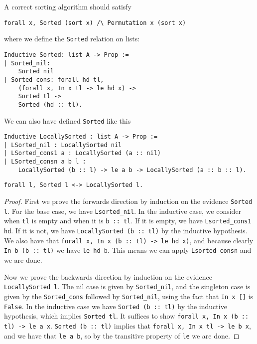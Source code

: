 \documentclass[11pt]{article}
\begin{document}
A correct sorting algorithm should satisfy
\begin{verbatim}
forall x, Sorted (sort x) /\ Permutation x (sort x)
\end{verbatim}
where we define the \verb|Sorted| relation on lists:
\begin{verbatim}
Inductive Sorted: list A -> Prop :=
| Sorted_nil:
    Sorted nil
| Sorted_cons: forall hd tl,
    (forall x, In x tl -> le hd x) ->
    Sorted tl ->
    Sorted (hd :: tl).
\end{verbatim}

We can also have defined \verb|Sorted| like this
\begin{verbatim}
Inductive LocallySorted : list A -> Prop :=
| LSorted_nil : LocallySorted nil
| LSorted_cons1 a : LocallySorted (a :: nil)
| LSorted_consn a b l :
    LocallySorted (b :: l) -> le a b -> LocallySorted (a :: b :: l).
\end{verbatim}

\begin{theorem}
\begin{verbatim}
forall l, Sorted l <-> LocallySorted l.
\end{verbatim}
\end{theorem}

\begin{proof}
  First we prove the forwards direction by induction on the evidence
  \verb|Sorted l|. For the base case, we have \verb|Lsorted_nil|. In
  the inductive case, we consider when \verb|tl| is empty and when it
  is \verb|b :: tl|. If it is empty, we have \verb|Lsorted_cons1 hd|.
  If it is not, we have \verb|LocallySorted (b :: tl)| by the
  inductive hypothesis. We also have that
  \verb|forall x, In x (b :: tl) -> le hd x)|, and because clearly
  \verb|In b (b :: tl)| we have \verb|le hd b|. This means we can
  apply \verb|Lsorted_consn| and we are done.

  Now we prove the backwards direction by induction on the evidence
  \verb|LocallySorted l|. The nil case is given by \verb|Sorted_nil|,
  and the singleton case is given by the \verb|Sorted_cons| followed
  by \verb|Sorted_nil|, using the fact that \verb|In x []| is
  \verb|False|. In the inductive case we have \verb|Sorted (b :: tl)|
  by the inductive hypothesis, which implies \verb|Sorted tl|. It
  suffices to show \verb|forall x, In x (b :: tl) -> le a x|.
  \verb|Sorted (b :: tl)| implies that
  \verb|forall x, In x tl -> le b x|, and we have that \verb|le a b|,
  so by the transitive property of \verb|le| we are done.
\end{proof}
\end{document}

